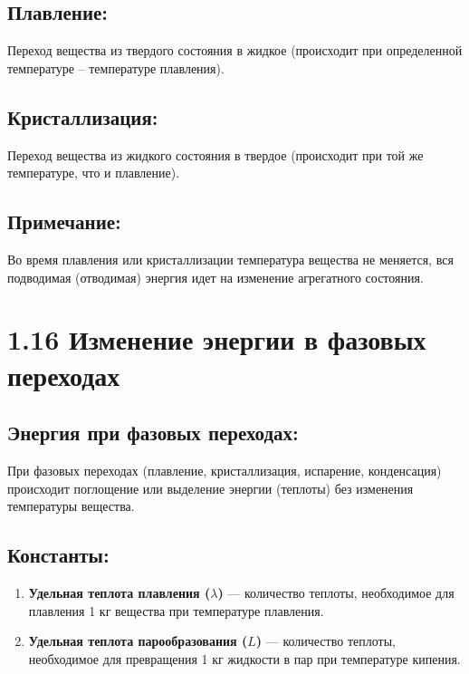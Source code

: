 \documentclass[a4paper,12pt]{article}
\begin{document}
\vspace{-9pt}
\subsection*{Плавление:}
\vspace{-3pt}
Переход вещества из твердого состояния в жидкое (происходит при определенной температуре – температуре плавления).

\vspace{-9pt}
\subsection*{Кристаллизация:}
\vspace{-3pt}
Переход вещества из жидкого состояния в твердое (происходит при той же температуре, что и плавление).

\vspace{-9pt}
\subsection*{Примечание:}
\vspace{-3pt}
Во время плавления или кристаллизации температура вещества не меняется, вся подводимая (отводимая) энергия идет на изменение агрегатного состояния.


\newpage
\section*{1.16 Изменение энергии в фазовых переходах}

\vspace{-9pt}
\subsection*{Энергия при фазовых переходах:}
\vspace{-3pt}
При фазовых переходах (плавление, кристаллизация, испарение, конденсация) происходит поглощение или выделение энергии (теплоты) без изменения температуры вещества.

\vspace{-9pt}
\subsection*{Константы:}
\vspace{-3pt}
\begin{enumerate} [itemsep=0pt, topsep=0pt, parsep=0pt]
    \item \textbf{Удельная теплота плавления ($\lambda$)} --- количество теплоты, необходимое для плавления 1 кг вещества при температуре плавления.
    \item \textbf{Удельная теплота парообразования ($L$)} --- количество теплоты, необходимое для превращения 1 кг жидкости в пар при температуре кипения.
\end{enumerate}
\end{document}
